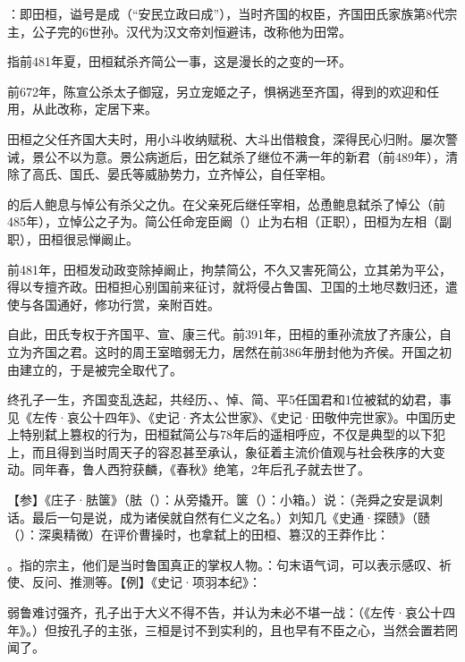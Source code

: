 {
\item {}：即田桓，谥号是成（“安民立政曰成”），当时齐国的权臣，齐国田氏家族第8代宗主，公子完的6世孙。汉代为汉文帝刘恒避讳，改称他为田常。

指前481年夏，田桓弑杀齐简公一事，这是漫长的之变的一环。
\begin{lyenumerate}
\item 前672年，陈宣公杀太子御寇，另立宠姬之子，惧祸逃至齐国，得到的欢迎和任用，从此改称，定居下来。
\item 田桓之父任齐国大夫时，用小斗收纳赋税、大斗出借粮食，深得民心归附。屡次警诫，景公不以为意。景公病逝后，田乞弑杀了继位不满一年的新君（前489年），清除了高氏、国氏、晏氏等威胁势力，立齐悼公，自任宰相。
\item {}的后人鲍息与悼公有杀父之仇。在父亲死后继任宰相，怂恿鲍息弑杀了悼公（前485年），立悼公之子为。简公任命宠臣阚（）止为右相（正职），田桓为左相（副职），田桓很忌惮阚止。
\item 前481年，田桓发动政变除掉阚止，拘禁简公，不久又害死简公，立其弟为平公，得以专擅齐政。田桓担心别国前来征讨，就将侵占鲁国、卫国的土地尽数归还，遣使与各国通好，修功行赏，亲附百姓。
\item 自此，田氏专权于齐国平、宣、康三代。前391年，田桓的重孙流放了齐康公，自立为齐国之君。这时的周王室暗弱无力，居然在前386年册封他为齐侯。开国之初由建立的，于是被完全取代了。
\end{lyenumerate}
终孔子一生，齐国变乱迭起，共经历、、悼、简、平5任国君和1位被弑的幼君，事见《左传·哀公十四年》、《史记·齐太公世家》、《史记·田敬仲完世家》。中国历史上特别弑上篡权的行为，田桓弑简公与78年后的遥相呼应，不仅是典型的以下犯上，而且得到当时周天子的容忍甚至承认，象征着主流价值观与社会秩序的大变动。同年春，鲁人西狩获麟，《春秋》绝笔，2年后孔子就去世了。%

【参】《庄子·胠箧》（胠（）：从旁撬开。箧（）：小箱。）说：（尧舜之安是讽刺话。最后一句是说，成为诸侯就自然有仁义之名。）刘知几《史通·探赜》（赜（）：深奥精微）在评价曹操时，也拿弑上的田桓、篡汉的王莽作比：

\item {}。指的宗主，他们是当时鲁国真正的掌权人物。：句末语气词，可以表示感叹、祈使、反问、推测等。【例】《史记·项羽本纪》：

弱鲁难讨强齐，孔子出于大义不得不告，并认为未必不堪一战：（《左传·哀公十四年》。）但按孔子的主张，三桓是讨不到实利的，且也早有不臣之心，当然会置若罔闻了。
}
{}


